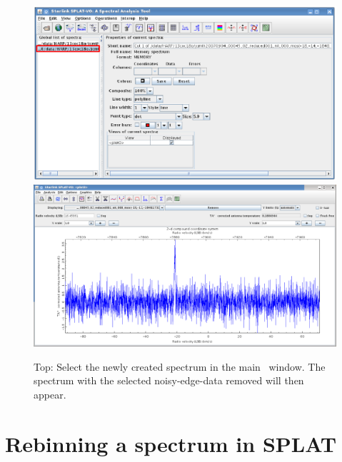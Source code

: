 \documentclass[11pt,oneside,chapters]{starlink}
\begin{document}
\begin{enumerate}[label=(\textbf{\arabic*})]
\begin{figure}[h!]
\begin{center}
\includegraphics[width=0.65\linewidth]{sc20_splat_window_main_cut}
\includegraphics[width=0.7\linewidth]{sc20_splat_cut_spectrum}
\caption[Spectrum with noisy edges removed.]{\label{fig:splat_crop5}
  Top: Select the newly created spectrum in the main \splat\ window.
  The spectrum with the selected noisy-edge-data removed will then appear. }
\end{center}
\end{figure}

\end{enumerate}

\section{Rebinning a spectrum in SPLAT}
\label{sec:splat-rebin}
\end{document}
